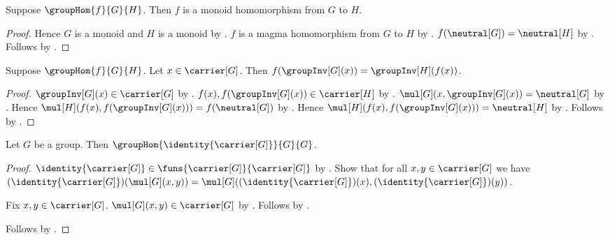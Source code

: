 \begin{theorem}\label{group_hom_is_monoid_hom}
    Suppose $\groupHom{f}{G}{H}$.
    Then $f$ is a monoid homomorphism from $G$ to $H$.
\end{theorem}
\begin{proof}
    Hence $G$ is a monoid and $H$ is a monoid by
        .
    $f$ is a magma homomorphism from $G$ to $H$ by
        .
    $f(\neutral[G])=\neutral[H]$ by .
    Follows by .
\end{proof}

\begin{theorem}\label{group_hom_inverse}
    Suppose $\groupHom{f}{G}{H}$.
    Let $x\in\carrier[G]$.
    Then $f(\groupInv[G](x))=\groupInv[H](f(x))$.
\end{theorem}
\begin{proof}
    $\groupInv[G](x)\in\carrier[G]$ by
        .
    $f(x),f(\groupInv[G](x))\in\carrier[H]$ by
        .
    $\mul[G](x,\groupInv[G](x))=\neutral[G]$ by
        .
    Hence
        $\mul[H](f(x),f(\groupInv[G](x)))=f(\neutral[G])$ by
        .
    Hence
        $\mul[H](f(x),f(\groupInv[G](x)))=\neutral[H]$ by
        .
    Follows by .
\end{proof}

\begin{proposition}\label{identity_group_hom}
    Let $G$ be a group.
    Then $\groupHom{\identity{\carrier[G]}}{G}{G}$.
\end{proposition}
\begin{proof}
    $\identity{\carrier[G]}\in
        \funs{\carrier[G]}{\carrier[G]}$ by
        .
    Show that for all $x,y\in\carrier[G]$ we have
        $(\identity{\carrier[G]})(\mul[G](x,y))=
            \mul[G]
                ((\identity{\carrier[G]})(x),
                 (\identity{\carrier[G]})(y))$.
    \begin{subproof}
        Fix $x,y\in\carrier[G]$.
        $\mul[G](x,y)\in\carrier[G]$ by
            .
        Follows by .
    \end{subproof}
    Follows by .
\end{proof}

